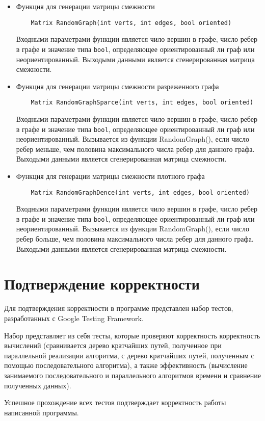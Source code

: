 \documentclass{report}
\begin{document}
\begin{itemize}
    \item Функция для генерации матрицы смежности
    \begin{lstlisting}
    Matrix RandomGraph(int verts, int edges, bool oriented)
    \end{lstlisting}
    \par Входными параметрами функции является чило вершин в графе, число ребер в графе и значение типа \verb|bool|, определяющее ориентированный ли граф или неориентированный. Выходыми данными является сгенерированная матрица смежности.
    \item Функция для генерации матрицы смежности разреженного графа
    \begin{lstlisting}
    Matrix RandomGraphSparce(int verts, int edges, bool oriented)
    \end{lstlisting}
    \par Входными параметрами функции является чило вершин в графе, число ребер в графе и значение типа \verb|bool|, определяющее ориентированный ли граф или неориентированный. Вызывается из функции RandomGraph(), если число ребер меньше, чем половина максимального числа ребер для данного графа. Выходыми данными является сгенерированная матрица смежности.
    \item Функция для генерации матрицы смежности плотного графа
    \begin{lstlisting}
    Matrix RandomGraphDence(int verts, int edges, bool oriented)
    \end{lstlisting}
    \par Входными параметрами функции является чило вершин в графе, число ребер в графе и значение типа \verb|bool|, определяющее ориентированный ли граф или неориентированный. Вызывается из функции RandomGraph(), если число ребер больше, чем половина максимального числа ребер для данного графа. Выходыми данными является сгенерированная матрица смежности.
\end{itemize}
\newpage

\section*{Подтверждение корректности}
Для подтверждения корректности в программе представлен набор тестов, разработанных с Google Testing Framework.
\par Набор представляет из себя тесты, которые проверяют корректность корректность вычислений (сравнивается дерево кратчайших путей, полученное при параллельной реализации алгоритма, с дерево кратчайших путей, полученным с помощью последовательного алгоритма), а также эффективность (вычисление занимаемого последовательного и параллельного алгоритмов времени и сравнение полученных данных).
\par Успешное прохождение всех тестов подтверждает корректность работы написанной программы.
\newpage
\end{document}
